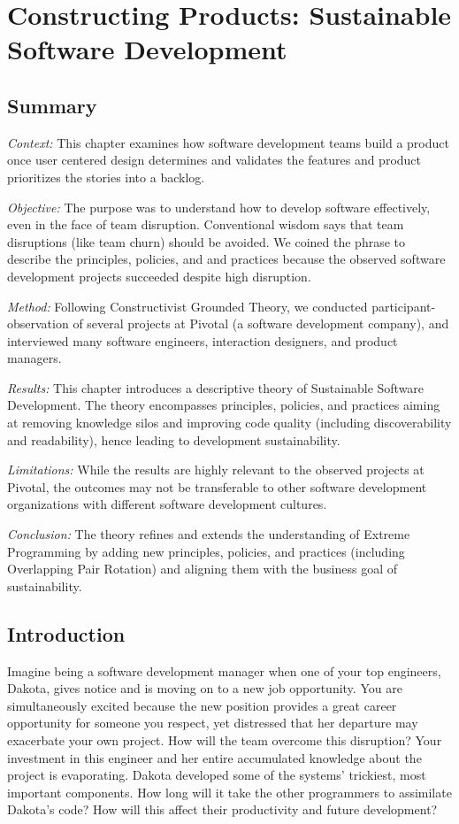 \chapter{Constructing Products: Sustainable Software Development}
\label{SustainableSoftwareDevelopmentChapter}

\section{Summary}

\textit{Context:} This chapter examines how software development teams build a product once  user centered design determines and validates the features and product prioritizes the stories into a backlog.

\textit{Objective:} The purpose was to understand how to develop software effectively, even in the face of team disruption. Conventional wisdom says that team disruptions (like team churn) should be avoided. We coined the phrase  to describe the principles, policies, and and practices because the observed software development projects succeeded despite high disruption. 

\textit{Method:} Following Constructivist Grounded Theory, we conducted participant-observation of several projects at Pivotal (a software development company), and interviewed many software engineers, interaction designers, and product managers. 

\textit{Results:} This chapter introduces a descriptive theory of Sustainable Software Development. The theory encompasses principles, policies, and practices aiming at removing knowledge silos and improving code quality (including discoverability and readability), hence leading to development sustainability. 

\textit{Limitations:} While the results are highly relevant to the observed projects at Pivotal, the outcomes may not be transferable to other software development organizations with different software development cultures.

\textit{Conclusion:} The theory refines and extends the understanding of Extreme Programming by adding new principles, policies, and practices (including Overlapping Pair Rotation) and aligning them with the business goal of sustainability. 

\section{Introduction}
Imagine being a software development manager when one of your top engineers, Dakota, gives notice and is moving on to a new job opportunity. You are simultaneously excited because the new position provides a great career opportunity for someone you respect, yet distressed that her departure may exacerbate your own project. How will the team overcome this disruption? Your investment in this engineer and her entire accumulated knowledge about the project is evaporating. Dakota developed some of the systems' trickiest, most important components. How long will it take the other programmers to assimilate Dakota's code?  How will this affect their productivity and future development?


